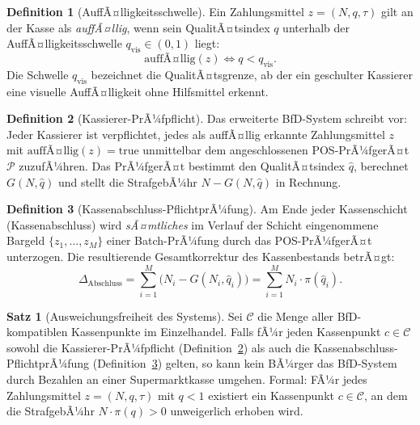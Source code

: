 ﻿\documentclass[a4paper,12pt]{article}
\theoremstyle{definition}
\newtheorem{definition}{Definition}
\newtheorem{satz}{Satz}
\begin{document}
\begin{definition}[AuffÃ¤lligkeitsschwelle]
\label{def:auffaellig}
Ein Zahlungsmittel $z = (N, q, \tau)$ gilt an der Kasse als
\emph{auffÃ¤llig}, wenn sein QualitÃ¤tsindex $q$ unterhalb der
AuffÃ¤lligkeitsschwelle $q_{\text{vis}} \in (0,1)$ liegt:
\[
\text{auffÃ¤llig}(z) \iff q < q_{\text{vis}}.
\]
Die Schwelle $q_{\text{vis}}$ bezeichnet die QualitÃ¤tsgrenze, ab der ein
geschulter Kassierer eine visuelle AuffÃ¤lligkeit ohne Hilfsmittel erkennt.
\end{definition}

\begin{definition}[Kassierer-PrÃ¼fpflicht]
\label{def:prÃ¼fpflicht}
Das erweiterte BfD-System schreibt vor: Jeder Kassierer ist verpflichtet,
jedes als auffÃ¤llig erkannte Zahlungsmittel $z$ mit $\text{auffÃ¤llig}(z) = \text{true}$
unmittelbar dem angeschlossenen POS-PrÃ¼fgerÃ¤t $\mathcal{P}$ zuzufÃ¼hren.
Das PrÃ¼fgerÃ¤t bestimmt den QualitÃ¤tsindex $\hat{q}$, berechnet $G(N,\hat{q})$
und stellt die StrafgebÃ¼hr $N - G(N,\hat{q})$ in Rechnung.
\end{definition}

\begin{definition}[Kassenabschluss-PflichtprÃ¼fung]
\label{def:kassenabschluss}
Am Ende jeder Kassenschicht (Kassenabschluss) wird \emph{sÃ¤mtliches}
im Verlauf der Schicht eingenommene Bargeld $\{z_1,\ldots,z_M\}$ einer
Batch-PrÃ¼fung durch das POS-PrÃ¼fgerÃ¤t unterzogen.
Die resultierende Gesamtkorrektur des Kassenbestands betrÃ¤gt:
\[
\Delta_{\text{Abschluss}} = \sum_{i=1}^{M} \bigl(N_i - G(N_i, \hat{q}_i)\bigr)
= \sum_{i=1}^{M} N_i \cdot \pi(\hat{q}_i).
\]
\end{definition}

\begin{satz}[Ausweichungsfreiheit des Systems]
\label{satz:ausweich}
Sei $\mathcal{C}$ die Menge aller BfD-kompatiblen Kassenpunkte im Einzelhandel.
Falls fÃ¼r jeden Kassenpunkt $c \in \mathcal{C}$ sowohl die Kassierer-PrÃ¼fpflicht
(Definition~\ref{def:prÃ¼fpflicht}) als auch die Kassenabschluss-PflichtprÃ¼fung
(Definition~\ref{def:kassenabschluss}) gelten, so kann kein BÃ¼rger das BfD-System
durch Bezahlen an einer Supermarktkasse umgehen.  Formal:
FÃ¼r jedes Zahlungsmittel $z = (N, q, \tau)$ mit $q < 1$ existiert ein
Kassenpunkt $c \in \mathcal{C}$, an dem die StrafgebÃ¼hr $N \cdot \pi(q) > 0$
unweigerlich erhoben wird.
\end{satz}
\end{document}

